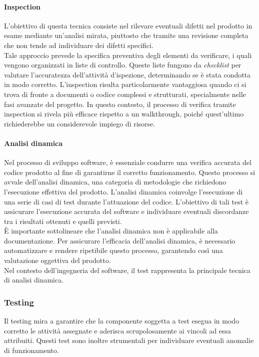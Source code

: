 \paragraph{Inspection}
L'obiettivo di questa tecnica consiste nel rilevare eventuali difetti nel prodotto in esame mediante un'analisi mirata, piuttosto che tramite una revisione completa che non tende ad individuare dei difetti specifici. \\
Tale approccio prevede la specifica preventiva degli elementi da verificare, i quali vengono organizzati in liste di controllo.
Queste liste fungono da \textit{checklist} per valutare l'accuratezza dell'attività d'ispezione, determinando se è stata condotta in modo corretto.
L'inspection risulta particolarmente vantaggiosa quando ci si trova di fronte a documenti o codice complessi e strutturati, specialmente nelle fasi avanzate del progetto. In questo contesto, il processo di verifica tramite inspection si rivela più efficace rispetto a un walkthrough, poiché quest'ultimo richiederebbe un considerevole impiego di risorse.

\paragraph{Analisi dinamica} 
Nel processo di sviluppo software, è essenziale condurre una verifica accurata del codice prodotto al fine di garantirne il corretto funzionamento. Questo processo si avvale dell'analisi dinamica, una categoria di metodologie che richiedono l'esecuzione effettiva del prodotto.
L'analisi dinamica coinvolge l'esecuzione di una serie di casi di test durante l'attuazione del codice. L'obiettivo di tali test è assicurare l'esecuzione accurata del software e individuare eventuali discordanze tra i risultati ottenuti e quelli previsti. \\
È importante sottolineare che l'analisi dinamica non è applicabile alla documentazione.
Per assicurare l'efficacia dell'analisi dinamica, è necessario automatizzare e rendere ripetibile questo processo, garantendo così una valutazione oggettiva del prodotto. \\
Nel contesto dell'ingegneria del software, il test rappresenta la principale tecnica di analisi dinamica.

\subsubsection{Testing}
\label{subsec:Testing}
Il testing mira a garantire che la componente soggetta a test esegua in modo corretto le attività assegnate e aderisca scrupolosamente ai vincoli ad essa attribuiti. Questi test sono inoltre strumentali per individuare eventuali anomalie di funzionamento.

